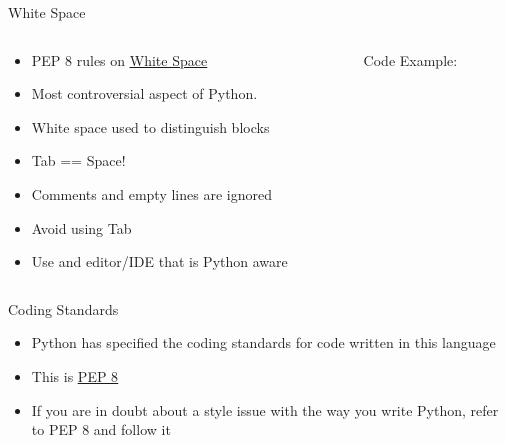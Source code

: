 % 
% 
% 
\begin{Slide}{White Space}

  \begin{columns}
    \begin{column}{.48\textwidth}
      
      \begin{itemize}
      \item PEP 8 rules on \underline{\href{https://www.python.org/dev/peps/pep-0008/\#whitespace-in-expressions-and-statements}{White Space}}
      \item Most controversial aspect of Python.
      \item White space used to distinguish blocks
      \item Tab == Space!
      \item Comments and empty lines are ignored
      \item Avoid using Tab
      \item Use and editor/IDE that is Python aware
      \end{itemize}
      
      
    \end{column}

    \hfill

    \begin{column}{.48\textwidth}
      Code Example:
      

      \inputminted[firstline=3,
      lastline=18,
      breaklines,
      fontsize=\tiny,
      bgcolor=Background,
      linenos]{python}{../src/whitespace.py}
      
      
    \end{column}
  \end{columns}


\end{Slide}

% 
% 
% 
\begin{Slide}{Coding Standards}
  \begin{itemize}
  \item Python has specified the coding standards for code written in this language
  \item This is \underline{\href{https://www.python.org/dev/peps/pep-0008/}{PEP 8}}
  \item If you are in doubt about a style issue with the way you write Python, refer to PEP 8 and follow it
  \end{itemize}
\end{Slide}

